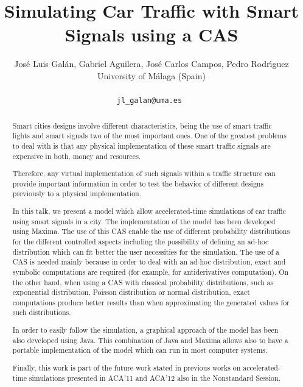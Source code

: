 \documentclass[a4paper]{article} %
\date{} %
\def\titulo#1{\title{#1}} %
\def\autores#1{\author{#1}} %
\begin{document}
\titulo{Simulating Car Traffic with Smart Signals using a CAS}

\autores{Jos\'e Luis Gal\'an, Gabriel Aguilera, Jos\'e Carlos Campos, Pedro Rodr\'{\i}guez \\ %
       University of M\'alaga (Spain) \\ \\ %
       \tt{jl\_galan@uma.es} %
       }%


\maketitle

\thispagestyle{empty}




\begin{abstract}

Smart cities designs involve different characteristics, being the use of smart traffic lights and smart signals two of the most important ones. One of the greatest problems to deal with is that any physical implementation of these smart traffic signals are expensive in both, money and resources.

Therefore, any virtual implementation of such signals within a traffic structure can provide important information in order to test the behavior of different designs previously to a physical implementation.

In this talk, we present a model which allow accelerated-time simulations of car traffic using smart signals in a city. The implementation of the model has been developed using {\sc Maxima}. The use of this CAS enable the use of different probability distributions for the different controlled aspects including the possibility of defining an ad-hoc distribution which can fit better the user necessities for the simulation. The use of a CAS is needed mainly because in order to deal with an ad-hoc distribution, exact and symbolic computations are required (for example, for antiderivatives computation). On the other hand, when using a CAS with classical probability distributions, such as exponential distribution, Poisson distribution or normal distribution, exact computations produce better results than when approximating the generated values for such distributions.

In order to easily follow the simulation, a graphical approach of the model has been also developed using Java. This combination of Java and Maxima allows also to have a portable implementation of the model which can run in most computer systems.

Finally, this work is part of the future work stated in previous works on accelerated-time simulations presented in ACA'11 and ACA'12 also in the Nonstandard Session.

\end{abstract}
\end{document}
